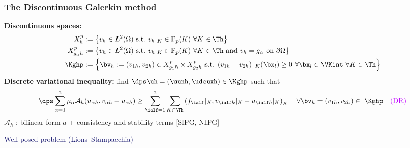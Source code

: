 \begin{frame}
  \frametitle{The Discontinuous Galerkin method}
  \textcolor{cadmiumgreen}{\textbf{Discontinuous spaces:}}
  \begin{equation*}
    \begin{split}
      X_h^p &:= \left\{ v_h \in L^2(\Omega) \ \text{s.t.} \ v_h|_{K} \in \mathbb{P}_p(K) \ \forall K \in \Th \right\} \\
      X_{g_{\alpha} h}^p &:= \left\{ v_h \in L^2(\Omega) \ \text{s.t.} \ v_h|_{K} \in \mathbb{P}_p(K) \ \forall K \in \Th \ \text{and} \ v_h=g_{\alpha} \ \text{on} \ \partial \Omega \right\} \\
       \Kghp & := \left\{ \bv_h := \left(v_{1h},v_{2h}  \right) \in X_{g_{1} h}^p \times X_{g_{2} h}^p \ \text{s.t.} \ \left(v_{1h} - v_{2h}\right)|_{K}(\bx_l) \geq 0 \ \forall \bx_l \in \VKint \ \forall K \in \Th \right\}
    \end{split}
  \end{equation*}
  \textcolor{cadmiumgreen}{\textbf{Discrete variational inequality:}} find $\dps \uh=(\uunh,\udeuxh) \in \Kghp$ such that
\begin{equation*}
\dps \sum_{\alpha=1}^2 \mu_{\alpha} \mathcal{A}_h(u_{\alpha h}, v_{\alpha h} - u_{\alpha h}) \geq \sum_{\ialf=1}^2 \sum_{K \in \Th} \left(f_\ialf|_K,v_{\ialf h}|_K-u_{\ialf h}|_K\right)_{K} \quad \forall \bv_h = (v_{1h},v_{2h})\in ~\Kghp \quad \textcolor{electricpurple}{(\mathrm{DR})}
\end{equation*}
$\mathcal{A}_h$ : bilinear form $a$ + consistency and stability terms [SIPG, NIPG]
\vspace*{0.2 cm}
  \begin{center}
\textcolor{midnightblue}{Well-posed problem (Lions--Stampacchia)}
\end{center}
\end{frame}
